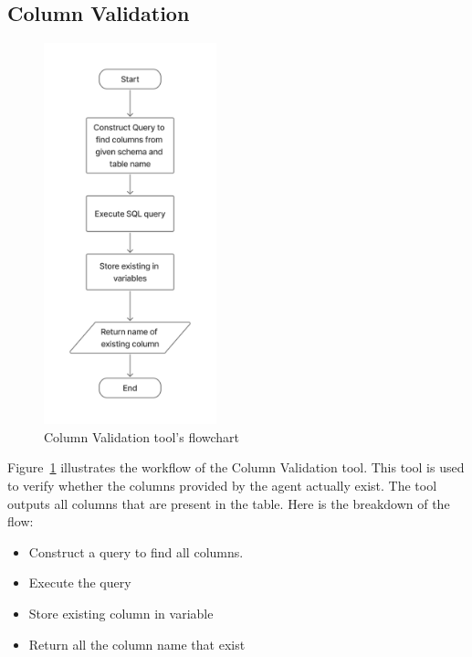     \subsection{Column Validation}
    \label{sec:column_validation}
    \begin{figure}[H]
        \centering
        \includegraphics[width=5cm]{chapters/3/figures/column_validate.jpg}
        \caption[Column Validation tool’s flowchart]{Column Validation tool’s flowchart}
        \label{fig:column_validate}
    \end{figure}
    Figure~\ref{fig:column_validate} illustrates the workflow of the Column Validation tool. This tool is used to verify whether the columns provided by the agent actually exist. The tool outputs all columns that are present in the table.
    Here is the breakdown of the flow:
    \begin{itemize}
        \item  Construct a query to find all columns.
        \item  Execute the query
        \item  Store existing column in variable
        \item  Return all the column name that exist
    \end{itemize}

